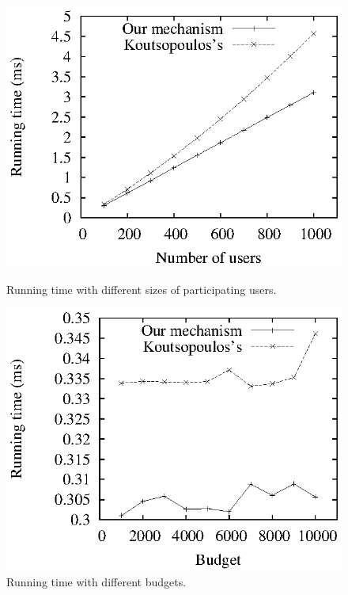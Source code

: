 \documentclass[conference]{IEEEtran}
\theoremstyle{definition}
\begin{document}
{\begin{figure}[!t]
\centering
\begin{minipage}{0.31\textwidth}
\includegraphics[width=\textwidth]{collusion_resist_codes/images/img_running_time.eps}
\caption{Running time with different sizes of participating users.}
\label{fig:running_time_n}
\end{minipage}
\hspace{0.01cm}
\begin{minipage}{0.31\textwidth}
\includegraphics[width=\textwidth]{collusion_resist_codes/images/img_running_time_R.eps}
\caption{Running time with different budgets.}
\label{fig:running_time_R}

\end{minipage}
\end{figure}}
\end{document}

